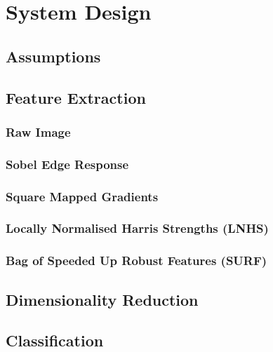 \chapter{System Design}
\label{chap:design}

\section{Assumptions}


\section{Feature Extraction}

\subsection{Raw Image}

\subsection{Sobel Edge Response}

\subsection{Square Mapped Gradients}

\subsection{Locally Normalised Harris Strengths (LNHS)}

\subsection{Bag of Speeded Up Robust Features (SURF)}



\section{Dimensionality Reduction}

\section{Classification}



